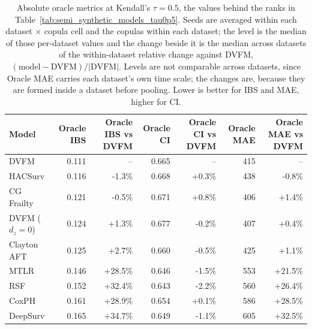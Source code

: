 \begin{table}
\caption{Absolute oracle metrics at Kendall's $\tau=0.5$, the values behind the ranks in Table~\ref{tab:semi_synthetic_models_tau0p5}. Seeds are averaged within each dataset $\times$ copula cell and the copulas within each dataset; the level is the median of those per-dataset values and the change beside it is the median across datasets of the within-dataset relative change against DVFM, $(\text{model} - \text{DVFM})/|\text{DVFM}|$. Levels are not comparable across datasets, since Oracle MAE carries each dataset's own time scale; the changes are, because they are formed inside a dataset before pooling. Lower is better for IBS and MAE, higher for CI.}
\label{tab:semi_synthetic_absolute_metrics_tau0p5}
\begin{tabular}{lrrrrrr}
\toprule
Model & Oracle IBS & Oracle IBS vs DVFM & Oracle CI & Oracle CI vs DVFM & Oracle MAE & Oracle MAE vs DVFM \\
\midrule
DVFM & 0.111 & -- & 0.665 & -- & 415 & -- \\
HACSurv & 0.116 & -1.3\% & 0.668 & +0.3\% & 438 & -0.8\% \\
CG Frailty & 0.121 & -0.5\% & 0.671 & +0.8\% & 406 & +1.4\% \\
DVFM ($d_z{=}0$) & 0.124 & +1.3\% & 0.677 & -0.2\% & 407 & +0.4\% \\
Clayton AFT & 0.125 & +2.7\% & 0.660 & -0.5\% & 425 & +1.1\% \\
MTLR & 0.146 & +28.5\% & 0.646 & -1.5\% & 553 & +21.5\% \\
RSF & 0.152 & +32.4\% & 0.643 & -2.2\% & 560 & +26.4\% \\
CoxPH & 0.161 & +28.9\% & 0.654 & +0.1\% & 586 & +28.5\% \\
DeepSurv & 0.165 & +34.7\% & 0.649 & -1.1\% & 605 & +32.5\% \\
\bottomrule
\end{tabular}
\end{table}
